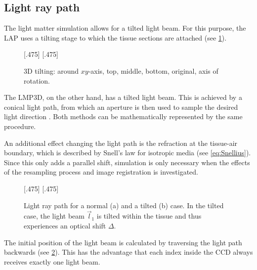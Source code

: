 \subsection{Light ray path}
\label{sec:pathOfLight}
%
The light matter simulation allows for a tilted light beam.
For this purpose, the \ac{LAP} uses a tilting stage to which the tissue sections are attached (see \cref{fig:tilting_camera_view}).
%
\begin{figure}[!t]
\setlength{\tikzheight}{0.42\textwidth}
[.475\textwidth]{}\hfill
{}
[.475\textwidth]{}
\tikzset{external/export=false}
\caption[3D tilting]{3D tilting: around $xy$-axis, \raisebox{.25em}{\tikz \draw[red,thick](0,0)--(0.25,0);} top, \raisebox{.25em}{\tikz \draw[green,thick](0,0)--(0.25,0);} middle, \raisebox{.25em}{\tikz \draw[blue,thick](0,0)--(0.25,0);} bottom, \raisebox{.25em}{\tikz \draw[dash pattern=on 1.25pt off 1.25pt,thick](0,0)--(0.25,0);} original, \raisebox{.25em}{\tikz \draw[gray](0,0)--(0.25,0);} axis of rotation.}
\label{fig:tilting_camera_view}
\end{figure}
% 
The \ac{LMP3D}, on the other hand, has a tilted light beam.
This is achieved by a conical light path, from which an aperture is then used to sample the desired light direction \cite{Wiese:887678}.
Both methods can be mathematically represented by the same procedure.
\par
%
An additional effect changing the light path is the refraction at the tissue-air boundary, which is described by Snell's law for isotropic media (see \cref{eq:Snellius}).
Since this only adds a parallel shift, simulation is only necessary when the effects of the resampling process and image registration is investigated.
\par
%
\begin{figure}[!t]
\setlength{\tikzwidth}{0.45\textwidth}
[.475\textwidth]{
\def\tilt{0}
\def\nindex{2.25}
}\hfill
{}[.475\textwidth]{
}
\caption[Light path]{Light ray path for a normal (a) and a tilted (b) case. In the tilted case, the light beam $\vec{l}_1$ is tilted within the tissue and thus experiences an optical shift $\Delta$.}
\label{fig:tilted_side_view}
\end{figure}
%
The initial position of the light beam is calculated by traversing the light path backwards (see \cref{fig:tilted_side_view}).
This has the advantage that each index inside the \ac{CCD} always receives exactly one light beam.

